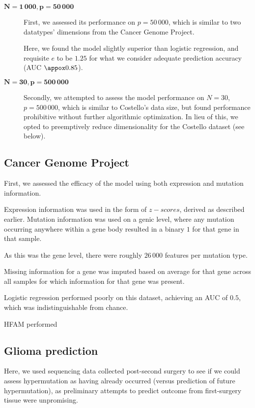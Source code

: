 \begin{description}
\item[$\mathbf{N = 1\,000, p = 50\,000}$] 

First, we assessed its performance on $p = 50\,000$, which is similar to two datatypes' dimensions from the Cancer Genome Project.

Here, we found the model slightly superior than logistic regression, and requisite $e$ to be $1.25$ for what we consider adequate prediction accuracy (AUC $\appox 0.85$). 

\item[$\mathbf{N = 30, p = 500\,000}$] 
Secondly, we attempted to assess the model performance on  $N = 30$, $p = 500\,000$, which is similar to Costello's data size, but found performance prohibitive without further algorithmic optimization. In lieu of this, we opted to preemptively reduce dimensionality for the Costello dataset (see below).
\end{description}

\subsection{Cancer Genome Project}

First, we assessed the efficacy of the model using both expression and mutation information.

Expression information was used in the form of $z-scores$, derived as described earlier. Mutation information was used on a genic level, where any mutation occurring anywhere within a gene body resulted in a binary $1$ for that gene in that sample.

As this was the gene level, there were roughly $26\,000$ features per mutation type.

Missing information for a gene was imputed based on average for that gene across all samples for which information for that gene was present. 

Logistic regression performed poorly on this dataset, achieving an AUC of $0.5$, which was indistinguishable from chance.

HFAM performed 



\subsection{Glioma prediction}

Here, we used sequencing data collected post-second surgery to see if we could assess hypermutation as having already occurred (versus prediction of future hypermutation), as preliminary attempts to predict outcome from first-surgery tissue were unpromising.

